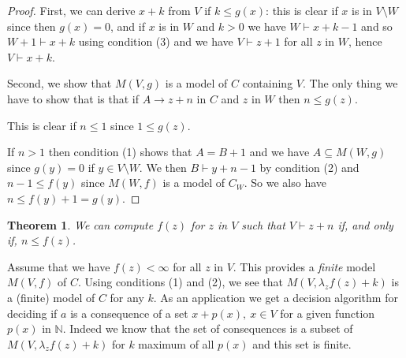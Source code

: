 \documentclass[11pt,a4paper]{article}
\newtheorem{theorem}{Theorem}[section]
\newcommand{\nats}{\mathbb{N}}
\begin{document}
\begin{proof}
  First, we can derive $x+k$ from $V$ if $k\leqslant g(x)$: this is clear if $x$ is in $V\setminus W$
  since then $g(x) = 0$, and if $x$ is in $W$ and $k>0$ we have $W\vdash x+k-1$ and so $W+1\vdash x+k$
  using condition (3) and we have $V\vdash z+1$ for all $z$ in $W$, hence $V\vdash x+k$.

  Second,  we show that $M(V,g)$ is a model of $C$ containing $V$. The only thing we have to show that is that
  if $A\rightarrow z+n$ in $C$ and $z$ in $W$ then $n\leqslant g(z)$.

  This is clear if $n\leqslant 1$ since $1\leqslant g(z)$.

  If $n>1$ then condition (1) shows that $A = B+1$ and we have
  $A\subseteq M(W,g)$ since $g(y) = 0$ if $y\in V\setminus W$. We then $B\vdash y+n-1$
  by condition (2) and $n-1\leqslant f(y)$ since $M(W,f)$ is a model of $C_W$.
  So we also have $n\leqslant f(y)+1 = g(y)$.
\end{proof}

\begin{theorem}
We can compute $f(z)$ for $z$ in $V$ such that $V\vdash z+n$ if, and only if, $n\leqslant f(z)$.
\end{theorem}  


Assume that we have $f(z)<\infty$ for all $z$ in $V$. This provides a {\em finite} model $M(V,f)$
of $C$. Using conditions (1) and (2), we see that $M(V, \lambda_z f(z) +k)$ is a (finite) model of $C$
for any $k$. As an application we get a decision algorithm for deciding if $a$ is a consequence
of a set $x+p(x),~x\in V$ for a given function $p(x)$ in $\nats$. Indeed we know that the set of
consequences is a subset of $M(V, \lambda_z f(z)+k)$ for $k$ maximum of all $p(x)$ and this set
is finite.






\end{document}
